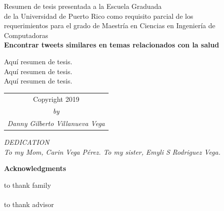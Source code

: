 \documentclass[12pt]{report}
\begin{document}
	\begin{center}
		Resumen de tesis presentada a la Escuela Graduada\\
		de la Universidad de Puerto Rico como requisito parcial de los\\
		requerimientos para el grado de Maestr\'ia en Ciencias en Ingenier\'ia de Computadoras\\
		
		\vspace{.1cm}
		\large\textbf {Encontrar tweets similares en temas relacionados con la salud}
	\end{center}
	\doublespacing
	Aqu\'i resumen de tesis.\\
	Aqu\'i resumen de tesis.\\
	Aqu\'i resumen de tesis.\\
	\par
	\clearpage
	
	\vspace*{\fill}
	\begin{table}[H]
		\centering
		\begin{adjustbox}{max width=\textwidth }
			\begin{tabular}{c}
				Copyright \textcopyright\hspace{0.15cm}2019 \\
				\textit{by}\\
				\textit{Danny Gilberto Villanueva Vega}\\
			\end{tabular}
		\end{adjustbox} 
	\end{table}
	\vfill
	\clearpage
	
	\vspace*{\fill}
	\begin{center}
		\textit{DEDICATION}\\
		\vspace{2cm}
		\textit{To my Mom, Carin Vega P\'erez. To my sister, Emyli S Rodriguez Vega.}
	\end{center}
	\vfill
	\clearpage
	
	\vspace*{\fill}
	
	\begin{center}
		\Large \textbf{Acknowledgments}
	\end{center}
	to thank family\\
	\\
	to thank advisor\\
	
\end{document}
